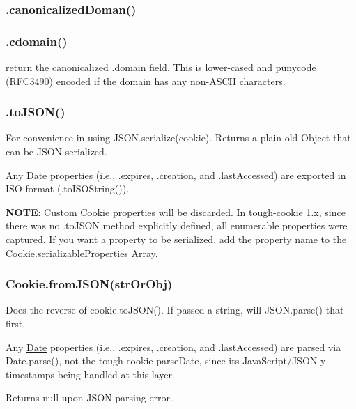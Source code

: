 \subsubsection*{{\ttfamily .canonicalized\+Doman()}}

\subsubsection*{{\ttfamily .cdomain()}}

return the canonicalized {\ttfamily .domain} field. This is lower-\/cased and punycode (R\+F\+C3490) encoded if the domain has any non-\/\+A\+S\+C\+II characters.

\subsubsection*{{\ttfamily .to\+J\+S\+O\+N()}}

For convenience in using {\ttfamily J\+S\+O\+N.\+serialize(cookie)}. Returns a plain-\/old {\ttfamily Object} that can be J\+S\+O\+N-\/serialized.

Any {\ttfamily \mbox{\hyperlink{classDate}{Date}}} properties (i.\+e., {\ttfamily .expires}, {\ttfamily .creation}, and {\ttfamily .last\+Accessed}) are exported in I\+SO format ({\ttfamily .to\+I\+S\+O\+String()}).

{\bfseries N\+O\+TE}\+: Custom {\ttfamily Cookie} properties will be discarded. In tough-\/cookie 1.\+x, since there was no {\ttfamily .to\+J\+S\+ON} method explicitly defined, all enumerable properties were captured. If you want a property to be serialized, add the property name to the {\ttfamily Cookie.\+serializable\+Properties} Array.

\subsubsection*{{\ttfamily Cookie.\+from\+J\+S\+O\+N(str\+Or\+Obj)}}

Does the reverse of {\ttfamily cookie.\+to\+J\+S\+O\+N()}. If passed a string, will {\ttfamily J\+S\+O\+N.\+parse()} that first.

Any {\ttfamily \mbox{\hyperlink{classDate}{Date}}} properties (i.\+e., {\ttfamily .expires}, {\ttfamily .creation}, and {\ttfamily .last\+Accessed}) are parsed via {\ttfamily Date.\+parse()}, not the tough-\/cookie {\ttfamily parse\+Date}, since it\textquotesingle{}s Java\+Script/\+J\+S\+O\+N-\/y timestamps being handled at this layer.

Returns {\ttfamily null} upon J\+S\+ON parsing error.

